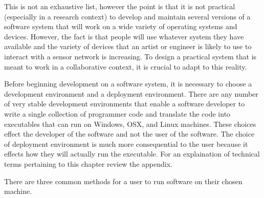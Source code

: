This is not an exhaustive list, however the point is that it is not practical (especially in a research context) to develop and maintain several versions of a software system that will work on a wide variety of operating systems and devices. However, the fact is that people will use whatever system they have available and the variety of devices that an artist or engineer is likely to use to interact with a sensor network is increasing. To design a practical system that is meant to work in a collaborative context, it is crucial to adapt to this reality.

Before beginning development on a software system, it is necessary to choose a development environment and a deployment environment. There are any number of very stable development environments that enable a software developer to write a single collection of programmer code and translate the code into executables that can run on Windows, OSX, and Linux machines. These choices effect the developer of the software and not the user of the software. The choice of deployment environment is much more consequential to the user because it effects how they will actually run the executable. For an explaination of technical terms pertaining to this chapter review the appendix.

There are three common methods for a user to run software on their chosen machine.

